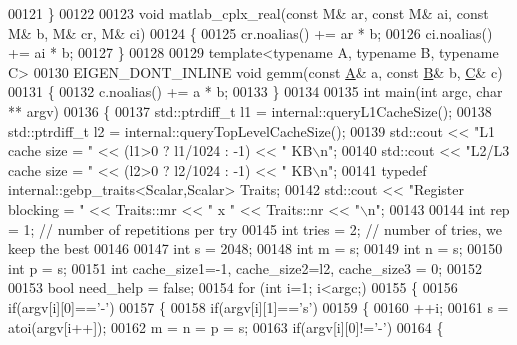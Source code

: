 \begin{DoxyCode}
00121 \}
00122 
00123 \textcolor{keywordtype}{void} matlab\_cplx\_real(\textcolor{keyword}{const} M& ar, \textcolor{keyword}{const} M& ai, \textcolor{keyword}{const} M& b, M& cr, M& ci)
00124 \{
00125   cr.noalias() += ar * b;
00126   ci.noalias() += ai * b;
00127 \}
00128 
00129 \textcolor{keyword}{template}<\textcolor{keyword}{typename} A, \textcolor{keyword}{typename} B, \textcolor{keyword}{typename} C>
00130 EIGEN\_DONT\_INLINE \textcolor{keywordtype}{void} gemm(\textcolor{keyword}{const} \hyperlink{group___core___module_class_eigen_1_1_matrix}{A}& a, \textcolor{keyword}{const} \hyperlink{group___core___module_class_eigen_1_1_matrix}{B}& b, \hyperlink{group___core___module}{C}& c)
00131 \{
00132  c.noalias() += a * b;
00133 \}
00134 
00135 \textcolor{keywordtype}{int} main(\textcolor{keywordtype}{int} argc, \textcolor{keywordtype}{char} ** argv)
00136 \{
00137   std::ptrdiff\_t l1 = internal::queryL1CacheSize();
00138   std::ptrdiff\_t l2 = internal::queryTopLevelCacheSize();
00139   std::cout << \textcolor{stringliteral}{"L1 cache size     = "} << (l1>0 ? l1/1024 : -1) << \textcolor{stringliteral}{" KB\(\backslash\)n"};
00140   std::cout << \textcolor{stringliteral}{"L2/L3 cache size  = "} << (l2>0 ? l2/1024 : -1) << \textcolor{stringliteral}{" KB\(\backslash\)n"};
00141   \textcolor{keyword}{typedef} internal::gebp\_traits<Scalar,Scalar> Traits;
00142   std::cout << \textcolor{stringliteral}{"Register blocking = "} << Traits::mr << \textcolor{stringliteral}{" x "} << Traits::nr << \textcolor{stringliteral}{"\(\backslash\)n"};
00143 
00144   \textcolor{keywordtype}{int} rep = 1;    \textcolor{comment}{// number of repetitions per try}
00145   \textcolor{keywordtype}{int} tries = 2;  \textcolor{comment}{// number of tries, we keep the best}
00146 
00147   \textcolor{keywordtype}{int} s = 2048;
00148   \textcolor{keywordtype}{int} m = s;
00149   \textcolor{keywordtype}{int} n = s;
00150   \textcolor{keywordtype}{int} p = s;
00151   \textcolor{keywordtype}{int} cache\_size1=-1, cache\_size2=l2, cache\_size3 = 0;
00152 
00153   \textcolor{keywordtype}{bool} need\_help = \textcolor{keyword}{false};
00154   \textcolor{keywordflow}{for} (\textcolor{keywordtype}{int} i=1; i<argc;)
00155   \{
00156     \textcolor{keywordflow}{if}(argv[i][0]==\textcolor{charliteral}{'-'})
00157     \{
00158       \textcolor{keywordflow}{if}(argv[i][1]==\textcolor{charliteral}{'s'})
00159       \{
00160         ++i;
00161         s = atoi(argv[i++]);
00162         m = n = p = s;
00163         \textcolor{keywordflow}{if}(argv[i][0]!=\textcolor{charliteral}{'-'})
00164         \{

\end{DoxyCode}
